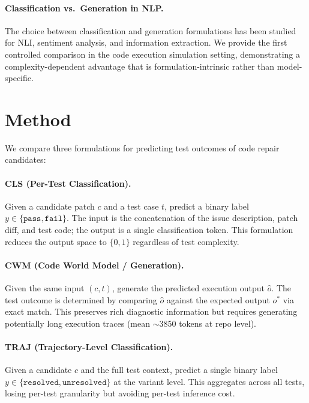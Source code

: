 \documentclass[11pt,a4paper]{article}
\begin{document}
\paragraph{Classification vs.\ Generation in NLP.}
The choice between classification and generation formulations has been studied for NLI, sentiment analysis, and information extraction.
We provide the first controlled comparison in the code execution simulation setting, demonstrating a complexity-dependent advantage that is formulation-intrinsic rather than model-specific.

\section{Method}

We compare three formulations for predicting test outcomes of code repair candidates:

\paragraph{CLS (Per-Test Classification).}
Given a candidate patch $c$ and a test case $t$, predict a binary label $y \in \{\texttt{pass}, \texttt{fail}\}$.
The input is the concatenation of the issue description, patch diff, and test code; the output is a single classification token.
This formulation reduces the output space to $\{0,1\}$ regardless of test complexity.

\paragraph{CWM (Code World Model / Generation).}
Given the same input $(c, t)$, generate the predicted execution output $\hat{o}$.
The test outcome is determined by comparing $\hat{o}$ against the expected output $o^*$ via exact match.
This preserves rich diagnostic information but requires generating potentially long execution traces (mean $\sim$3850 tokens at repo level).

\paragraph{TRAJ (Trajectory-Level Classification).}
Given a candidate $c$ and the full test context, predict a single binary label $y \in \{\texttt{resolved}, \texttt{unresolved}\}$ at the variant level.
This aggregates across all tests, losing per-test granularity but avoiding per-test inference cost.
\end{document}
